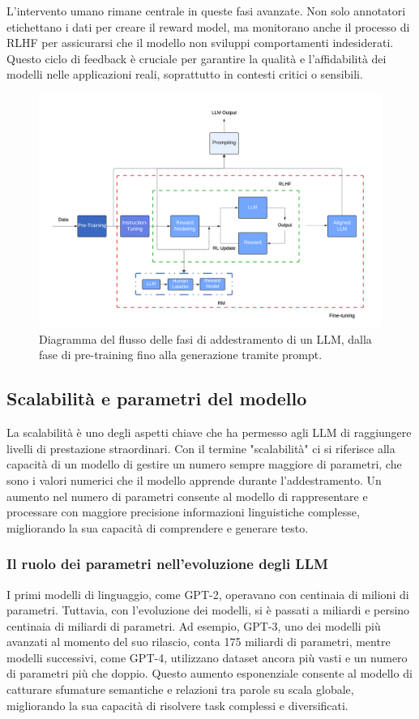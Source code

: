 \documentclass[target=mst,aauheader=,style=]{thud}
\begin{document}
L'intervento umano rimane centrale in queste fasi avanzate. Non solo annotatori etichettano i dati per creare il reward model, ma monitorano anche il processo di RLHF per assicurarsi che il modello non sviluppi comportamenti indesiderati. Questo ciclo di feedback è cruciale per garantire la qualità e l'affidabilità dei modelli nelle applicazioni reali, soprattutto in contesti critici o sensibili.

\begin{figure}[htbp]
    \centering
    \includegraphics[width=\linewidth]{immagini/pre-training-e-fine-tuning.png}
    \caption{Diagramma del flusso delle fasi di addestramento di un LLM, dalla fase di pre-training fino alla generazione tramite prompt.}
    \label{fig:example}
\end{figure}

\subsection{Scalabilità e parametri del modello}
La scalabilità è uno degli aspetti chiave che ha permesso agli LLM di raggiungere livelli di prestazione straordinari. Con il termine "scalabilità" ci si riferisce alla capacità di un modello di gestire un numero sempre maggiore di parametri, che sono i valori numerici che il modello apprende durante l’addestramento. Un aumento nel numero di parametri consente al modello di rappresentare e processare con maggiore precisione informazioni linguistiche complesse, migliorando la sua capacità di comprendere e generare testo.

\subsubsection{Il ruolo dei parametri nell'evoluzione degli LLM}
I primi modelli di linguaggio, come GPT-2, operavano con centinaia di milioni di parametri. Tuttavia, con l’evoluzione dei modelli, si è passati a miliardi e persino centinaia di miliardi di parametri. Ad esempio, GPT-3, uno dei modelli più avanzati al momento del suo rilascio, conta 175 miliardi di parametri, mentre modelli successivi, come GPT-4, utilizzano dataset ancora più vasti e un numero di parametri più che doppio. Questo aumento esponenziale consente al modello di catturare sfumature semantiche e relazioni tra parole su scala globale, migliorando la sua capacità di risolvere task complessi e diversificati.
\end{document}
